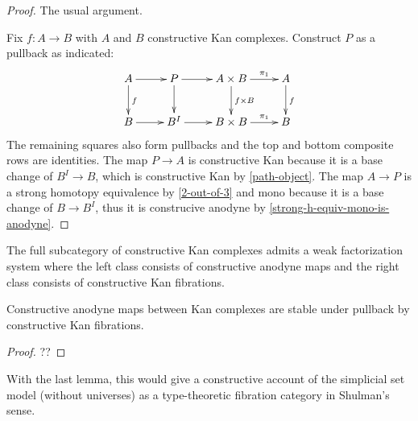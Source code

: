 \documentclass[reqno,10pt,a4paper,oneside]{amsart}
\begin{document}
\begin{proof}
The usual argument.

Fix $f : A \to B$ with $A$ and $B$ constructive Kan complexes.
Construct $P$ as a pullback as indicated:
\[
\xymatrix{
  A
  \ar[r]
  \ar[d]^{f}
&
  P
  \ar[r]
  \ar[d]
&
  A \times B
  \ar[r]^-{\pi_1}
  \ar[d]^{f \times B}
&
  A
  \ar[d]^{f}
\\
  B
  \ar[r]
&
  B^I
  \ar[r]
&
  B \times B
  \ar[r]^-{\pi_1}
&
  B
}
\]
The remaining squares also form pullbacks and the top and bottom composite rows are identities.
The map $P \to A$ is constructive Kan because it is a base change of $B^I \to B$, which is constructive Kan by \cref{path-object}.
The map $A \to P$ is a strong homotopy equivalence by \cref{2-out-of-3} and mono because it is a base change of $B \to B^I$, thus it is construcive anodyne by \cref{strong-h-equiv-mono-is-anodyne}.
\end{proof}

\begin{corollary}
\label{wfs-anodyne-fibration}
The full subcategory of constructive Kan complexes admits a weak factorization system where the left class consists of constructive anodyne maps and the right class consists of constructive Kan fibrations.
\end{corollary}

\begin{lemma}
Constructive anodyne maps between Kan complexes are stable under pullback by constructive Kan fibrations.
\end{lemma}

\begin{proof}
??
\end{proof}

With the last lemma, this would give a constructive account of the simplicial set model (without universes) as a type-theoretic fibration category in Shulman's sense.



\end{document}
